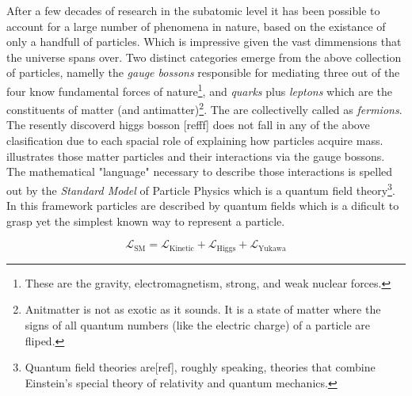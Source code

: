 After a few decades of research in the subatomic level it has been possible to account for a large number of phenomena
in nature, based on the existance of only a handfull of particles. Which is impressive given the vast dimmensions that the
universe spans over. Two distinct categories emerge from the above collection of particles, namelly the {\it gauge
bossons} responsible for mediating three out of the four know fundamental forces of
nature\footnote{These are the gravity, electromagnetism, strong, and weak nuclear forces.}, and {\it quarks} plus {\it leptons} which are the
constituents of matter
(and antimatter)\footnote{Anitmatter is not as exotic as it sounds. It is a state of matter where the
signs of all quantum numbers (like the electric charge) of a particle are fliped.}. The are collectivelly called as {\it fermions}.
The resently discoverd higgs bosson [{\color{red}refff}] does not fall in any of the above clasification due to each spacial role of explaining how particles acquire mass.
 illustrates those matter particles and their interactions via the gauge bossons.
The mathematical "language" necessary to describe those interactions is spelled out by the \textit{Standard Model} of Particle Physics
which is a quantum field
theory\footnote{Quantum field theories are[{\color{red}ref}], roughly speaking, theories that combine Einstein's special theory of
relativity and quantum mechanics.}.
In this framework particles are described by quantum fields which is a dificult
to grasp yet the simplest known way to represent a particle.

\begin{equation}
\mathscr{L}_{\text{SM}} =
\mathscr{L}_{\text{Kinetic}} + \mathscr{L}_{\text{Higgs}} + \mathscr{L}_{\text{Yukawa}}
\label{lagrangian}
\end{equation}


